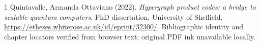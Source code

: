 \begin{thebibliography}{1}
 Quintavalle, Armanda Ottaviano (2022).
\emph{Hypergraph product codes: a bridge to scalable quantum computers}. PhD dissertation, University of Sheffield.
\url{https://etheses.whiterose.ac.uk/id/eprint/32300/}. Bibliographic identity and chapter locators verified from browser text; original PDF ink unavailable locally.
\end{thebibliography}
